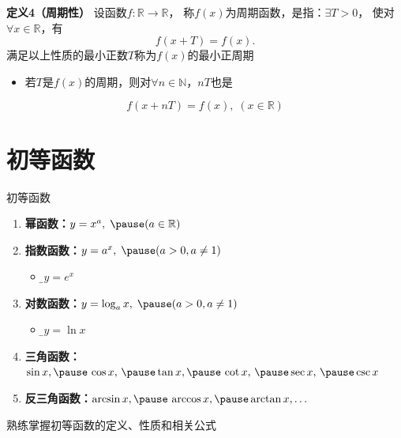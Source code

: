 \begin{frame}
	\linespread{1.4}
	\begin{block}{{\bf 定义4（周期性）}}\pause 
		设函数$f:\mathbb{R}\to\mathbb{R}$，\pause 
		称{\bb $f(x)$为周期函数}，是指：\pause $\exists T>0$，
		使对$\forall x\in\mathbb{R}$，有
		$$f(x+T)=f(x).$$
		\pause 满足以上性质的最小正数$T$称为$f(x)$的{\bb 最小正周期}
	\end{block}\pause 
	\begin{itemize}
	  \item 若$T$是$f(x)$的周期，则对$\forall n\in\mathbb{N}$，$nT$也是\pause
	\end{itemize}
	$$f(x+nT)=f(x),\;(x\in\mathbb{R})$$
\end{frame}

\section{初等函数}

\begin{frame}{初等函数}
	\linespread{1.4}\pause 
	\begin{enumerate}
	  \item {\bf 幂函数：}\pause $y=x^a,\;\pause (a\in\mathbb{R})$\pause 
	  \item {\bf 指数函数：}\pause $y=a^x,\;\pause (a>0,a\ne 1)$\pause 
	  \begin{itemize}
	    \item {\b $y=e^x$}\pause 
	  \end{itemize}
	  \item {\bf 对数函数：}\pause $y=\log_ax,\;\pause (a>0,a\ne 1)$\pause 
	  \begin{itemize}
	    \item {\b$y=\ln x$}\pause 
	  \end{itemize}
	  \item {\bf 三角函数：}\pause $\sin x,\pause \,\cos x,\,\pause \tan x,\pause \,\cot
	  x,\,\pause \sec x,\,\pause \csc x$\pause 
	  \item {\bf 反三角函数：}\pause $\arcsin x,\pause \,\arccos x,\pause \arctan x,
	  \ldots$\pause 
	\end{enumerate}
	{}\pause 熟练掌握初等函数的定义、性质和相关公式
\end{frame}

